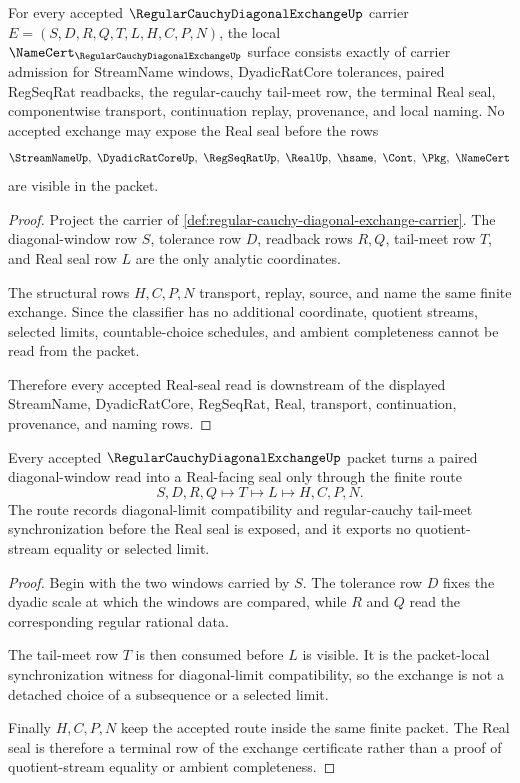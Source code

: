 \begin{theorem}
\label{thm:regular-cauchy-diagonal-exchange-namecert-obligations}
For every accepted $\RegularCauchyDiagonalExchangeUp$ carrier $E=(S,D,R,Q,T,L,H,C,P,N)$, the local $\NameCert_{\RegularCauchyDiagonalExchangeUp}$ surface consists exactly of carrier admission for StreamName windows, DyadicRatCore tolerances, paired RegSeqRat readbacks, the regular-cauchy tail-meet row, the terminal Real seal, componentwise transport, continuation replay, provenance, and local naming. No accepted exchange may expose the Real seal before the rows
$$
\StreamNameUp,\ \DyadicRatCoreUp,\ \RegSeqRatUp,\ \RealUp,\ \hsame,\ \Cont,\ \Pkg,\ \NameCert
$$
are visible in the packet.
\end{theorem}
\begin{proof}
Project the carrier of \autoref{def:regular-cauchy-diagonal-exchange-carrier}. The diagonal-window row $S$, tolerance row $D$, readback rows $R,Q$, tail-meet row $T$, and Real seal row $L$ are the only analytic coordinates.

The structural rows $H,C,P,N$ transport, replay, source, and name the same finite exchange. Since the classifier has no additional coordinate, quotient streams, selected limits, countable-choice schedules, and ambient completeness cannot be read from the packet.

Therefore every accepted Real-seal read is downstream of the displayed StreamName, DyadicRatCore, RegSeqRat, Real, transport, continuation, provenance, and naming rows.
\end{proof}

\begin{theorem}
\label{thm:regular-cauchy-diagonal-window-exchange}
Every accepted $\RegularCauchyDiagonalExchangeUp$ packet turns a paired diagonal-window read into a Real-facing seal only through the finite route
$$
S,D,R,Q \longmapsto T \longmapsto L \longmapsto H,C,P,N .
$$
The route records diagonal-limit compatibility and regular-cauchy tail-meet synchronization before the Real seal is exposed, and it exports no quotient-stream equality or selected limit.
\end{theorem}
\begin{proof}
Begin with the two windows carried by $S$. The tolerance row $D$ fixes the dyadic scale at which the windows are compared, while $R$ and $Q$ read the corresponding regular rational data.

The tail-meet row $T$ is then consumed before $L$ is visible. It is the packet-local synchronization witness for diagonal-limit compatibility, so the exchange is not a detached choice of a subsequence or a selected limit.

Finally $H,C,P,N$ keep the accepted route inside the same finite packet. The Real seal is therefore a terminal row of the exchange certificate rather than a proof of quotient-stream equality or ambient completeness.
\end{proof}

